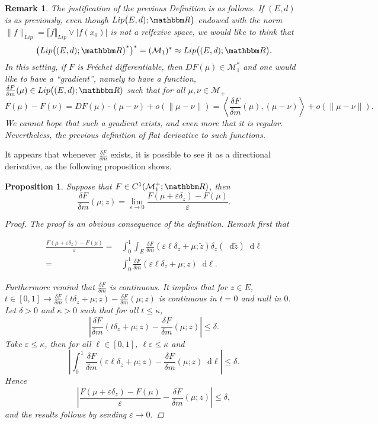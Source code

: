 \documentclass[a4paper,11pt, reqno]{amsart}
\newcommand{\cM}{\mathcal{M}}	\newcommand{\MM}{\mathbbm{M}}
\newcommand{\eps}{\varepsilon}
\newcommand{\dd}{\mathop{}\!\mathrm{d}}
\newcommand{\1}{\mathbbm{1}}
\theoremstyle{plain}
\newtheorem{proposition}[theorem]{Proposition}
\newtheorem{remark}[theorem]{Remark}
\theoremstyle{definition}
\begin{document}
\begin{remark}
  The justification of the previous Definition is as follows. If $(E,d)$ is as previously, even though  $Lip
  \big(E,d); \RR\big)$ endowed with the norm $\|f\|_{Lip}  = \llbracket f \rrbracket_{Lip}\vee |f(x_0)|$  is  not a relfexive space, we would like to think that
  \[ \big(Lip\big((E,d); \RR\big)^{\ast}\big)^{\ast} =(\cM_1)^{\ast} \approx  Lip\big((E,d); \RR\big). \]
  In this setting, if $F$ is Fr{\'e}chet differentiable, then $D F (\mu) \in
  \cM_1^{\ast}$ and one would like to have a ``gradient'', namely to
  have a function, $\frac{\delta F}{\delta m} (\mu) \in Lip \big((E,d); \RR)$
  such that for all $\mu, \nu \in \cM_+$
  \[ F (\mu) - F (\nu) = D F (\mu) \cdot (\mu - \nu) + o (\| \mu - \nu \|) =
     \left\langle \frac{\delta F}{\delta m} (\mu), (\mu - \nu) \right\rangle +
     o (\| \mu - \nu \|) . \]
  We cannot hope that such a gradient exists, and even more that it is regular. Nevertheless, the previous definition of flat derivative to such functions.   
\end{remark}

It appears that
  whenever $\frac{\delta F}{\delta m}$ exists, it is possible to see it as a
  directional derivative, as the following proposition shows.

\begin{proposition}
  Suppose that $F \in C^1 (\cM_1^+ ; \RR)$, then
  \[ \frac{\delta F}{\delta m} (\mu; z) = \lim_{\eps\to 0} \frac{F (\mu + \eps
     \delta_z) - F (\mu)}{\eps} . \]
  \begin{proof}
    The proof is an obvious consequence of the definition. Remark first that
    
    \begin{align*}
      \frac{F (\mu + \eps \delta_z) - F (\mu)}{\eps} = &
      \int_0^1 \int_E \frac{\delta F}{\delta m} (\eps \ell \delta_z +
      \mu ; \widetilde{z}) \delta_z (\dd \tilde{z}) \dd \ell\\
      = & \int_0^1 \frac{\delta F}{\delta m} (\eps \ell \delta_z + \mu
      ; z) \dd \ell .
    \end{align*}
    
    Furthermore remind that $\frac{\delta F}{\delta m}$ is continuous. It implies that for $z\in E$, $t \in [0,1]\to \frac{\delta F}{\delta m}(t\delta_z + \mu;z) - \frac{\delta F}{\delta m}(\mu;z)$ is continuous in $t=0$ and null in $0$. Let $\delta>0$ and $\kappa>0$ such that for all $t\le \kappa$, 
    \[\left|\frac{\delta F}{\delta m}(t\delta_z + \mu;z) - \frac{\delta F}{\delta m}(\mu;z)\right| \le \delta.\]
    Take $\eps\le\kappa$, then for all $\ell \in [0,1]$, $\ell \eps \le \kappa$ and 
    \[\left|\int_0^1 \frac{\delta F}{\delta m} (\eps \ell \delta_z + \mu
      ; z) - \frac{\delta F}{\delta m} ( \mu
      ; z) \dd \ell \right| \le \delta.\]
      Hence
    \[\left|\frac{F (\mu + \eps \delta_z) - F (\mu)}{\eps} - \frac{\delta F}{\delta m} ( \mu
      ; z)\right| \le \delta,\]
      and the results follows by sending $\eps\to 0$.
  \end{proof}
\end{proposition}
\end{document}
